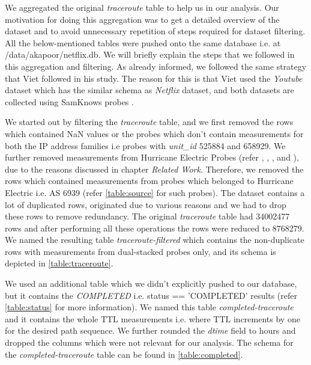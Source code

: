 We aggregated the original \textit{traceroute} table to help us in our analysis. Our motivation for doing this aggregation was to get a detailed overview of the dataset and to avoid unnecessary repetition of steps required for dataset filtering. All the below-mentioned tables were pushed onto the same database i.e. at /data/akapoor/netflix.db. We will briefly explain the steps that we followed in this aggregation and filtering. As already informed, we followed the same strategy that Viet \cite{viet} followed in his study. The reason for this is that Viet used the \textit{Youtube} dataset which has the similar schema as \textit{Netflix} dataset, and both datasets are collected using SamKnows probes \cite{samknows}. 


We started out by filtering the \textit{traceroute} table, and we first removed 
the rows which contained NaN values or the probes which don't contain 
measurements for both the IP address families i.e probes with \textit{unit\_id} 
525884 and 658929. We further removed measurements from Hurricane Electric Probes 
(refer \cite{he1}, \cite{he2}, \cite{he3}, \cite{he4} and \cite{he5}), due to the reasons discussed in chapter \textit{Related Work}. Therefore, we removed the rows which contained measurements from probes which belonged to Hurricane Electric i.e. AS 6939 (refer \cref{table:source} for such probes). The dataset contains a lot of duplicated rows, originated due to various reasons and we had to drop these rows to remove redundancy. The original \textit{traceroute} table had 34002477 rows and after performing all these operations the rows were reduced to 8768279. We named the resulting table \textit{traceroute-filtered} which contains the non-duplicate rows with measurements from dual-stacked probes only, and its schema is depicted in \cref{table:traceroute}. 


We used an additional table which we didn't explicitly pushed to our database, but it contains the \textit{COMPLETED} i.e. status == 'COMPLETED' results (refer \cref{table:status} for more information). 
We named this table \textit{completed-traceroute} and it contains the whole TTL measurements i.e. where TTL increments by one for the desired path sequence. 
We further rounded the \textit{dtime} field to hours and dropped the columns which were not relevant for our analysis. The schema for the \textit{completed-traceroute} table can be found in \cref{table:completed}. 


